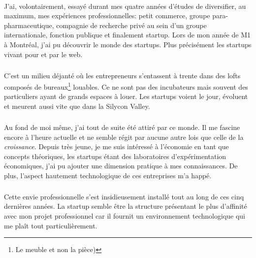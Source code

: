 \documentclass[11pt, a4paper ]{article}
\begin{document}
\begin{spacing}{1.5}
\paragraph{}
J'ai, volontairement, essayé durant mes quatre années d'études de diversifier, au maximum, mes expériences professionnelles: petit commerce, groupe para-pharmaceutique, compagnie de recherche privé au sein d'un groupe internationale, fonction publique et finalement startup.
Lors de mon année de M1 à Montréal, j'ai pu découvrir le monde des startups. Plus précisément les startups vivant pour et par le web.
\subparagraph{}
C'est un milieu déjanté où les entrepreneurs s'entassent à trente dans des lofts composés de bureaux\footnote{Le meuble et non la pièce)} louables. Ce ne sont pas des incubateurs mais souvent des particuliers ayant de grands espaces à louer. Les startups voient le jour, évoluent et meurent aussi vite que dans la Silycon Valley.
\subparagraph{}
Au fond de moi même, j'ai tout de suite été attiré par ce monde. Il me fascine encore à l'heure actuelle et ne semble régit par aucune autre lois que celle de la \emph{croissance}. Depuis très jeune, je me suis intéressé à l'économie en tant que concepts théoriques, les startups étant des laboratoires d'expérimentation économiques, j'ai pu ajouter une dimension pratique à mes connaissances. De plus, l'aspect hautement technologique de ces entreprises m'a happé.
\subparagraph{}
Cette envie professionnelle s'est insidieusement installé tout au long de ces cinq dernières années. La startup semble être la structure présentant le plus d'affinité avec mon projet professionnel car il fournit un environnement technologique qui me plaît tout particulièrement.


\end{spacing}
\end{document}
